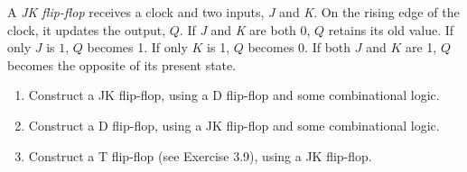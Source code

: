 \documentclass[12pt]{article}
\newenvironment{ex}[2][Exercise]{\begin{trivlist}
		\item[\hskip \labelsep {\bfseries #1}\hskip \labelsep {\bfseries #2.}]}{\end{trivlist}}
\begin{document}
\begin{ex}{3.10}
	A \emph{JK flip-flop} receives a clock and two inputs, \emph{J} and \emph{K}. On the rising edge of
	the clock, it updates the output, $Q$. If \emph{J} and \emph{K} are both 0, $Q$ retains its old value.
	If only $J$ is $1$, $Q$ becomes 1. If only $K$ is 1, $Q$ becomes 0. If both $J$ and $K$ are 1,
	$Q$ becomes the opposite of its present state.
	\begin{enumerate}[label=(\alph*)]
		\item Construct a JK flip-flop, using a D flip-flop and some combinational logic.
		\item Construct a D flip-flop, using a JK flip-flop and some combinational logic.
		\item Construct a T flip-flop (see Exercise 3.9), using a JK flip-flop.
	\end{enumerate}
\end{ex}
\end{document}
